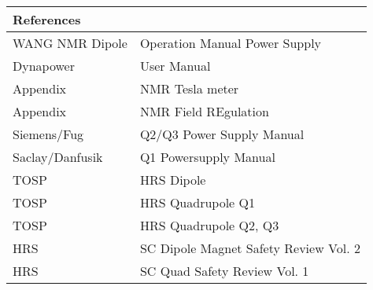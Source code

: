 \begin{tabular}{ll}
References & \\
\hline 
WANG NMR Dipole & Operation Manual Power Supply \\
Dynapower & User Manual \\
Appendix & NMR Tesla meter \\
Appendix & NMR Field REgulation \\
Siemens/Fug & Q2/Q3 Power Supply Manual \\
Saclay/Danfusik & Q1 Powersupply Manual \\
TOSP & HRS Dipole \\
TOSP & HRS Quadrupole Q1 \\
TOSP & HRS Quadrupole Q2, Q3 \\
HRS & SC Dipole Magnet Safety Review Vol. 2 \\
HRS & SC Quad Safety Review Vol. 1
\end{tabular}

